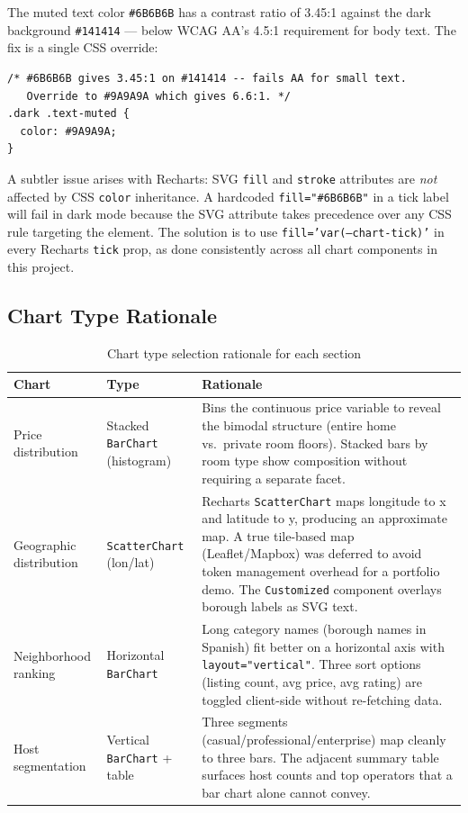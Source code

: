 The muted text color \texttt{\#6B6B6B} has a contrast ratio of 3.45:1 against the
dark background \texttt{\#141414} — below WCAG AA's 4.5:1 requirement for body
text. The fix is a single CSS override:

\begin{lstlisting}[language={},caption={Muted text contrast fix in \filepath{globals.css} (lines 64--67)}]
/* #6B6B6B gives 3.45:1 on #141414 -- fails AA for small text.
   Override to #9A9A9A which gives 6.6:1. */
.dark .text-muted {
  color: #9A9A9A;
}
\end{lstlisting}

A subtler issue arises with Recharts: SVG \texttt{fill} and \texttt{stroke}
attributes are \emph{not} affected by CSS \texttt{color} inheritance. A hardcoded
\texttt{fill="\#6B6B6B"} in a tick label will fail in dark mode because the SVG
attribute takes precedence over any CSS rule targeting the element. The solution is
to use \texttt{fill='var(--chart-tick)'} in every Recharts \texttt{tick} prop, as
done consistently across all chart components in this project.

\subsection{Chart Type Rationale}

\begin{table}[h]
  \centering
  \caption{Chart type selection rationale for each section}
  \label{tab:airbnb-charts}
  \begin{tabular}{p{3cm}p{3.5cm}p{6cm}}
    \toprule
    \textbf{Chart}         & \textbf{Type}             & \textbf{Rationale} \\
    \midrule
    Price distribution     & Stacked \texttt{BarChart} (histogram) &
      Bins the continuous price variable to reveal the bimodal
      structure (entire home vs.\ private room floors). Stacked bars by room type
      show composition without requiring a separate facet. \\
    \addlinespace
    Geographic distribution & \texttt{ScatterChart} (lon/lat) &
      Recharts \texttt{ScatterChart} maps longitude to x and latitude to y,
      producing an approximate map. A true tile-based map (Leaflet/Mapbox) was
      deferred to avoid token management overhead for a portfolio demo. The
      \texttt{Customized} component overlays borough labels as SVG text. \\
    \addlinespace
    Neighborhood ranking   & Horizontal \texttt{BarChart} &
      Long category names (borough names in Spanish) fit better on a horizontal
      axis with \texttt{layout="vertical"}. Three sort options (listing count,
      avg price, avg rating) are toggled client-side without re-fetching data. \\
    \addlinespace
    Host segmentation      & Vertical \texttt{BarChart} + table &
      Three segments (casual/professional/enterprise) map cleanly to three bars.
      The adjacent summary table surfaces host counts and top operators that a bar
      chart alone cannot convey. \\
    \bottomrule
  \end{tabular}
\end{table}

